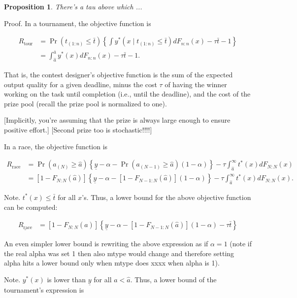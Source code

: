 \documentclass[11pt, titlepage]{article}
\newtheorem{proposition}{Proposition}
\newcommand\deadline{\bar{t}}
\newcommand\target{\underline{y}}
\newcommand\race{\text{race}}
\newcommand\tournament{\text{tour}}
\newcommand\mtype{\hat{a}}
\newcommand\hitype{\bar{a}}
\begin{document}
\begin{proposition}
There's a tau above which ... 
\end{proposition}

Proof. In a tournament, the objective function is

\begin{align}
R_\tournament & = \Pr(t_{(1:n)}\leq \deadline) \left\{\int y^*(x \mid t_{(1:n)}\leq \deadline) dF_{n:n}(x) - \tau \deadline - 1 \right\}  \nonumber\\
  & = \int_{\mtype}^{\hitype} y^*(x) dF_{n:n}(x) - \tau \deadline - 1. 
\end{align}

That is, the contest designer's objective function is the sum of the
expected output quality for a given deadline, minus the cost \(\tau\) of
having the winner working on the task until completion (i.e., until the
deadline), and the cost of the prize pool (recall the prize pool is
normalized to one).

{[}Implicitly, you're assuming that the prize is always large enough to
ensure positive effort.{]} {[}Second prize too is stochastic!!!!{]}

In a race, the objective function is

\begin{align}
R_\race & =  
  \Pr(a_{(N)}\geq \mtype) \left\{\target - \alpha -
  \Pr(a_{(N-1)}\geq \mtype) (1-\alpha) \right\}
  - \tau \int_{\mtype}^{\infty} t^*(x) dF_{N:N}(x) \nonumber\\
  & = [1-F_{N:N}(\mtype)] \left\{\target - \alpha -
  [1-F_{N-1:N}(\mtype)] (1 - \alpha) \right\}
  - \tau \int_{\mtype}^{\infty} t^*(x) dF_{N:N}(x).
\end{align}

Note. \(t^*(x) \leq \deadline\) for all \(x\)'s. Thus, a lower bound for
the above objective function can be computed:

\begin{align}
\underline {R_\race} & = 
  [1-F_{N:N}(\mtype)] \left\{\target - \alpha -
  [1-F_{N-1:N}(\mtype)] (1 - \alpha) - \tau \deadline\right\}
\end{align}

An even simpler lower bound is rewriting the above expression as if
\(\alpha=1\) (note if the real alpha was set 1 then also mtype would
change and therefore setting alpha hits a lower bound only when mtype
does xxxx when alpha is 1).

Note. \(y^*(x)\) is lower than \(\target\) for all \(a < \mtype\). Thus,
a lower bound of the tournament's expression is
\end{document}
